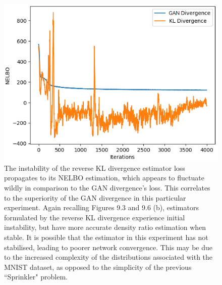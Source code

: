 \documentclass[honours,12pt]{unswthesis}
\numberwithin{equation}{section}
\theoremstyle{definition}
\begin{document}
\begin{figure}[h]
\centering
\includegraphics[width=0.49\linewidth]{part4nelbos/PCADVvsPCKLD.png}
\caption{\small The instability of the reverse KL divergence estimator loss propagates to its NELBO estimation, which appears to fluctuate wildly in comparison to the GAN divergence's loss. This correlates to the superiority of the GAN divergence in this particular experiment. Again recalling Figures 9.3 and 9.6 (b), estimators formulated by the reverse KL divergence experience initial instability, but have more accurate density ratio estimation when stable. It is possible that the estimator in this experiment has not stabilised, leading to poorer network convergence. This may be due to the increased complexity of the distributions associated with the MNIST dataset, as opposed to the simplicity of the previous ``Sprinkler" problem.}
\end{figure}
\end{document}

